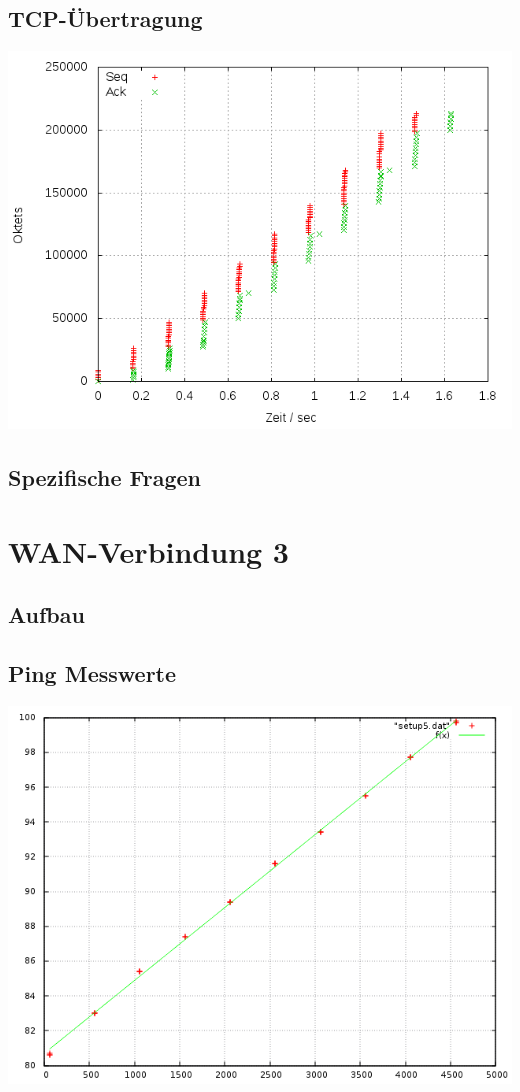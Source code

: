 \documentclass[a4paper,10pt]{article}
\begin{document}
\subsection{TCP-Übertragung}
\includegraphics[scale=0.75]{setup_wan2.png}

\subsection{Spezifische Fragen}


\section{WAN-Verbindung 3}

\subsection{Aufbau}

\subsection{Ping Messwerte}
\includegraphics[scale=0.75]{ping_setup_wan3.png}
\end{document}
